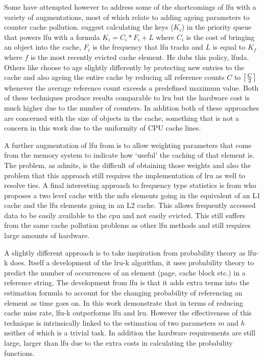 Some have attempted however to address some of the shortcomings of \gls{lfu} with a variety of augmentations, most of which relate to adding ageing parameters to counter cache pollution. \citet{arlittEvaluatingContentManagement2000} suggest calculating the keys ($K_i$) in the priority queue that powers \gls{lfu} with a formula $K_i = C_i * F_i + L$ where $C_i$ is the cost of bringing an object into the cache, $F_i$ is the frequency that \gls{lfu} tracks and $L$ is equal to $K_f$ where $f$ is the most recently evicted cache element. He dubs this policy, \gls{lfuda}. Others like \citet{robinsonDataCacheManagement1990} choose to age slightly differently by protecting new entries to the cache and also ageing the entire cache by reducing all reference counts $C$ to $\ceil[\big]{\frac{C}{2}}$ whenever the average reference count exceeds a predefined maximum value. Both of these techniques produce results comparable to \gls{lru} but the hardware cost is much higher due to the number of counters. In addition both of these approaches are concerned with the size of objects in the cache, something that is not a concern in this work due to the uniformity of CPU cache lines.

A further augmentation of \gls{lfu} from \citet{kellyVariableQosShared1999} is to allow weighting parameters that come from the memory system to indicate how `useful' the caching of that element is. The problem, as \citeauthor{kellyVariableQosShared1999} admits, is the difficult of obtaining those weights and also the problem that this approach still requires the implementation of \gls{lru} as well to resolve ties. A final interesting approach to frequency type statistics is from \citet{mekhielMultiLevelCacheMost29} who proposes a two level cache with the \gls{mfu} elements going in the equivalent of an L1 cache and the \gls{lfu} elements going in an L2 cache. This allows frequently accessed data to be easily available to the \gls{cpu} and not easily evicted. This still suffers from the same cache pollution problems as other \gls{lfu} methods and still requires large amounts of hardware.

A slightly different approach is to take inspiration from probability theory as \gls{lfu-k} \cite{sokolinskyLFUKEffectiveBuffer2004} does. Itself a development of the \gls{lru-k} algorithm, it uses probability theory to predict the number of occurrences of an element (page, cache block etc.) in a reference string. The development from \gls{lfu} is that it adds extra terms into the estimation formula to account for the changing probability of referencing an element as time goes on. In this work \citet{sokolinskyLFUKEffectiveBuffer2004} demonstrate that in terms of reducing cache miss rate, \gls{lfu-k} outperforms \gls{lfu} and \gls{lru}. However the effectiveness of this technique is intrinsically linked to the estimation of two parameters $m$ and $h$ neither of which is a trivial task. In addition the hardware requirements are still large, larger than \gls{lfu} due to the extra costs in calculating the probability functions. 

